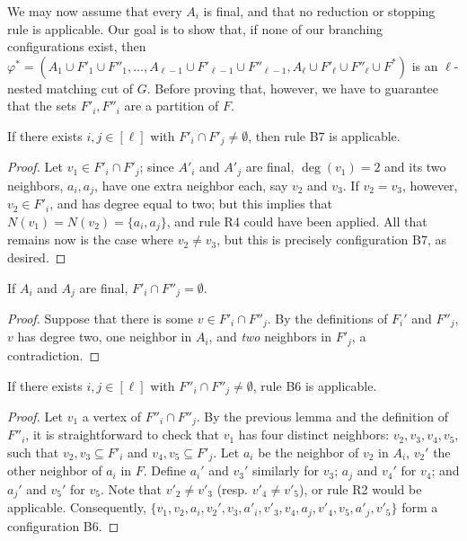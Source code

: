 We may now assume that every $A_i$ is final, and that no reduction or stopping rule is applicable.
Our goal is to show that, if none of our branching configurations exist, then $\varphi^* = (A_1 \cup F'_1 \cup F''_1, \dots, A_{\ell - 1} \cup F'_{\ell - 1} \cup F''_{\ell - 1}, A_\ell \cup F'_\ell \cup  F''_\ell \cup F^* )$ is an $\ell$-nested matching cut of $G$.
Before proving that, however, we have to guarantee that the sets $F'_i, F''_i$ are a partition of $F$.

\begin{lemma}
	If there exists $i,j \in [\ell]$ with $F'_i \cap F'_j \neq \emptyset$, then rule B7 is applicable.
\end{lemma}

\begin{proof}
	Let $v_1 \in F'_i \cap F'_j$; since $A'_i$ and $A'_j$ are final, $\deg(v_1) = 2$ and its two neighbors, $a_i, a_j$, have one extra neighbor each, say $v_2$ and $v_3$.
	If $v_2 = v_3$, however, $v_2 \in F'_i$, and has degree equal to two; but this implies that $N(v_1) = N(v_2) = \{a_i, a_j\}$, and rule R4 could have been applied.
	All that remains now is the case where $v_2 \neq v_3$, but this is precisely configuration B7, as desired.
\end{proof}

\begin{lemma}
	If $A_i$ and $A_j$ are final, $F'_i \cap F''_j = \emptyset$.
\end{lemma}

\begin{proof}
	Suppose that there is some $v \in F'_i \cap F''_j$.
	By the definitions of $F_i'$ and $F''_j$, $v$ has degree two, one neighbor in $A_i$, and \textit{two} neighbors in $F'_j$, a contradiction.
\end{proof}

\begin{lemma}
	If there exists $i,j \in [\ell]$ with $F''_i \cap F''_j \neq \emptyset$, rule B6 is applicable.	
\end{lemma}

\begin{proof}
	Let $v_1$ a vertex of $F''_i \cap F''_j$.
	By the previous lemma and the definition of $F''_i$, it is straightforward to check that $v_1$ has four distinct neighbors: $v_2, v_3, v_4, v_5$, such that $v_2, v_3 \subseteq F'_i$ and $v_4, v_5 \subseteq F'_j$.
	Let $a_i$ be the neighbor of $v_2$ in $A_i$, $v_2'$ the other neighbor of $a_i$ in $F$.
	Define $a_i'$ and $v_3'$ similarly for $v_3$; $a_j$ and $v_4'$ for $v_4$; and $a_j'$ and $v_5'$ for $v_5$.
	Note that $v'_2 \neq v'_3$ (resp. $v'_4 \neq v'_5$), or rule R2 would be applicable.
	Consequently, $\{v_1, v_2, a_i, v_2', v_3, a'_i, v'_3, v_4, a_j, v'_4, v_5, a'_j, v'_5\}$ form a configuration B6.
\end{proof}

